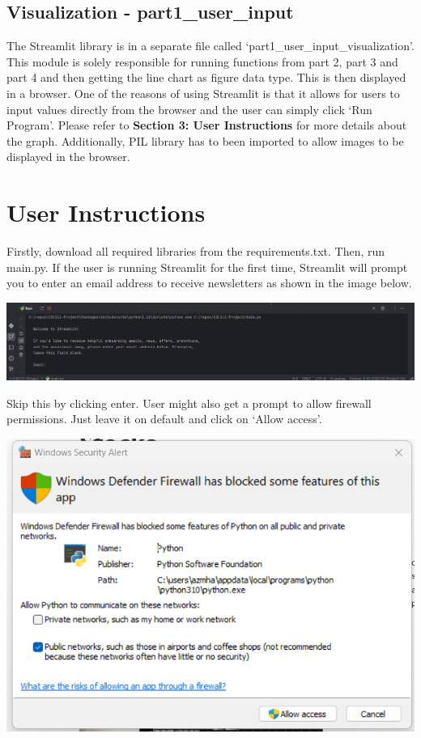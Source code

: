 \documentclass[fontsize=11pt]{article}
\begin{document}
\subsection{Visualization - part1\_user\_input}
The Streamlit library is in a separate file called `part1\_user\_input\_visualization'. This module is solely responsible for running functions from part 2, part 3 and part 4 and then getting the line chart as figure data type. This is then displayed in a browser. One of the reasons of using Streamlit is that it allows for users to input values directly from the browser and the user can simply click `Run Program'. Please refer to \textbf{Section 3: User Instructions} for more details about the graph. Additionally, PIL library has to been imported to allow images to be displayed in the browser. 

\section{User Instructions}
Firstly, download all required libraries from the requirements.txt. Then, run main.py. If the user is running Streamlit for the first time, Streamlit will prompt you to enter an email address to receive newsletters as shown in the image below. 
\begin{center}
\includegraphics[scale=0.27]{streamlit_prompt.png}
\end{center} 
Skip this by clicking enter. User might also get a prompt to allow firewall permissions. Just leave it on default and click on `Allow access'. 
\begin{center}
\includegraphics[scale=0.5]{firewall.png}
\end{center}
\end{document}
